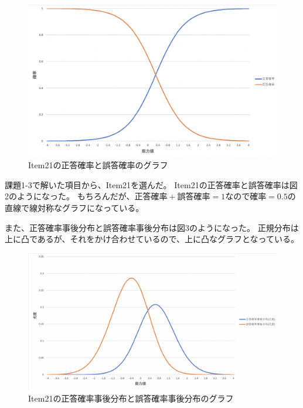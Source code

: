 \documentclass[12pt]{jarticle}
\begin{document}
\begin{figure}[h]
    \begin{center}
        \includegraphics[scale=0.3]{kadai5_2_2.png}
    \end{center}
    \caption{Item21の正答確率と誤答確率のグラフ}
\end{figure}

課題1-3で解いた項目から、Item21を選んだ。
Item21の正答確率と誤答確率は図2のようになった。
もちろんだが、$正答確率+誤答確率=1$なので$確率=0.5$の直線で線対称なグラフになっている。

また、正答確率事後分布と誤答確率事後分布は図3のようになった。
正規分布は上に凸であるが、それをかけ合わせているので、上に凸なグラフとなっている。


\clearpage
\begin{figure}[h]
    \begin{center}
        \includegraphics[scale=0.3]{kadai5_2_3.png}
    \end{center}
    \caption{Item21の正答確率事後分布と誤答確率事後分布のグラフ}
\end{figure}
\end{document}
